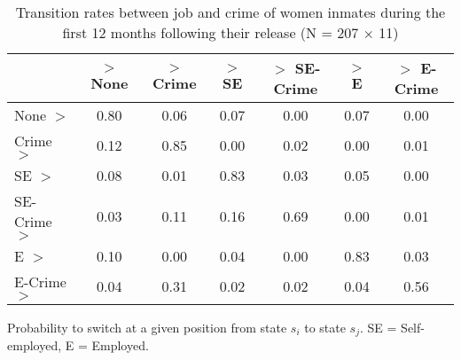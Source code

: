\begin{table}[htp]
\footnotesize
\setlength{\tabcolsep}{10pt}
\renewcommand{\arraystretch}{1.3}
\begin{threeparttable}
\centering
\caption{Transition rates between job and crime of women inmates \newline
    during the first 12 months following their release (N = 207 $\times$ 11)} 
\label{tab:transition_rates_jobs_crime}
\begin{tabular}{lcccccc}
  \hline
 & $>$ None & $>$ Crime & $>$ SE & $>$ SE-Crime & $>$ E & $>$ E-Crime \\ 
  \hline
None $>$ & 0.80 & 0.06 & 0.07 & 0.00 & 0.07 & 0.00 \\ 
  Crime $>$ & 0.12 & 0.85 & 0.00 & 0.02 & 0.00 & 0.01 \\ 
  SE $>$ & 0.08 & 0.01 & 0.83 & 0.03 & 0.05 & 0.00 \\ 
  SE-Crime $>$ & 0.03 & 0.11 & 0.16 & 0.69 & 0.00 & 0.01 \\ 
  E $>$ & 0.10 & 0.00 & 0.04 & 0.00 & 0.83 & 0.03 \\ 
  E-Crime $>$ & 0.04 & 0.31 & 0.02 & 0.02 & 0.04 & 0.56 \\ 
   \hline
\end{tabular}
\begin{tablenotes}
\scriptsize
\item Probability to switch at a given position from state $s_i$ to state $s_j$. SE = Self-employed, E = Employed.
\end{tablenotes}
\end{threeparttable}
\end{table}
